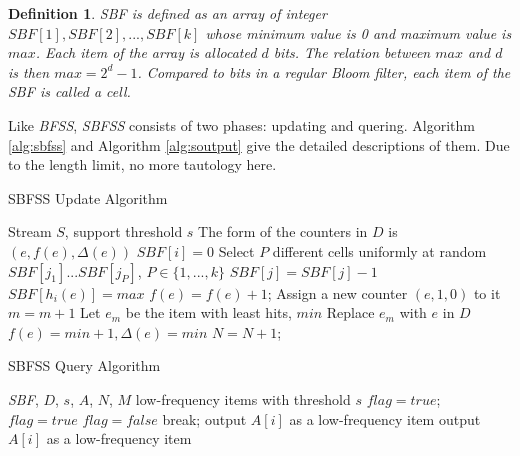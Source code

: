 \documentclass[conference]{IEEEtran}
\begin{document}
\newtheorem{defn}{Definition}
\begin{defn}\label{def:1}
\emph{SBF} is defined as an array of integer $SBF[1],SBF[2],...,SBF[k]$ whose minimum value is 0 and maximum value is $max$. Each item of the array is allocated $d$ bits. The relation between $max$ and $d$ is then $max=2^d-1$. Compared to bits in a regular Bloom ﬁlter, each item of the \emph{SBF} is called a cell.
\end{defn}

Like \emph{BFSS}, \emph{SBFSS} consists of two phases: updating and quering. Algorithm \ref{alg:sbfss} and Algorithm \ref{alg:soutput} give the detailed descriptions of them. Due to the length limit, no more tautology here.


\begin{algorithm}[h]
	\caption{SBFSS Update Algorithm}
	\label{alg:sbfss}
	\begin{algorithmic}[1]
		\REQUIRE Stream $S$, support threshold $s$
		\STATE The form of the counters in $D$ is $(e,f(e),\Delta(e))$
		\STATE $SBF[i]=0$
		\ENDFOR
		\STATE Select $P$ different cells uniformly at random $SBF[j_1]...SBF[j_P]$, $P\in \{1,...,k\}$
		\STATE $SBF[j]=SBF[j]-1$
		\ENDIF
		\ENDFOR
		\STATE $SBF[h_i(e)]=max$
		\ENDFOR
		\STATE $f(e)=f(e)+1$;
		\STATE Assign a new counter $(e,1,0)$ to it
		\STATE $m=m+1$
		\ELSE
		\STATE Let $e_m$ be the item with least hits, $min$
		\STATE Replace $e_m$ with $e$ in $D$
		\STATE $f(e)=min+1,\Delta(e)=min$
		\ENDIF
		\STATE $N=N+1$;
		\ENDFOR
	\end{algorithmic}
\end{algorithm}

\begin{algorithm}[h]
	\caption{SBFSS Query Algorithm}
	\label{alg:soutput}
	\begin{algorithmic}[1]
		\REQUIRE \emph{SBF}, $D$, $s$, $A$, $N$, $M$
		\ENSURE low-frequency items with threshold $s$
		\STATE $flag=true$; 
		\STATE $flag=true$
		\STATE $flag=false$
		\STATE break;
		\ENDIF
		\ENDFOR
		\STATE output $A[i]$ as a low-frequency item
		\ENDIF
		\ELSE
		\STATE output $A[i]$ as a low-frequency item
		\ENDIF
		\ENDIF
		\ENDFOR
	\end{algorithmic}
\end{algorithm}
\end{document}
